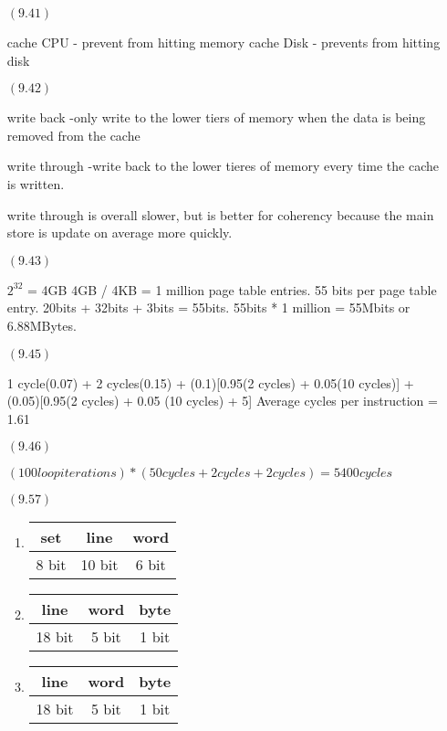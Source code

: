 \documentclass[letterpaper,10pt,titlepage]{article}
\begin{document}
\begin{enumerate}
\item[$(9.41)$]

cache CPU - prevent from hitting memory
cache Disk - prevents from hitting disk


\item[$(9.42)$]

write back -only write to the lower tiers of memory when the data is being removed from the cache

write through -write back to the lower tieres of memory every time the cache is written.

write through is overall slower, but is better for coherency because the main store is update on average more quickly.

\item[$(9.43)$]

$2^32$ = 4GB
4GB / 4KB = 1 million page table entries. 55 bits per page table entry. 20bits + 32bits + 3bits = 55bits.
55bits * 1 million = 55Mbits or 6.88MBytes.

\item[$(9.45)$] 

1 cycle(0.07) + 2 cycles(0.15) + (0.1)[0.95(2 cycles) + 0.05(10 cycles)] + (0.05)[0.95(2 cycles) + 0.05 (10 cycles) + 5]
Average cycles per instruction = 1.61

\item[$(9.46)$] 

$ (100 loop iterations)* (50 cycles + 2 cycles + 2 cycles) = 5400 cycles$

\item[$(9.57)$]

\begin{enumerate}

\item

\begin{tabular}{| c | c | c |}
    set & line & word \\ \hline
    8 bit & 10 bit & 6 bit \\ \hline
\end{tabular}

\item

\begin{tabular}{| c | c | c |}
    line & word & byte \\ \hline
    18 bit & 5 bit & 1 bit \\ \hline
\end{tabular}

\item

\begin{tabular}{| c | c | c |}
    line & word & byte \\ \hline
    18 bit & 5 bit & 1 bit \\ \hline
\end{tabular}

\end{enumerate}
\end{enumerate}
\end{document}
